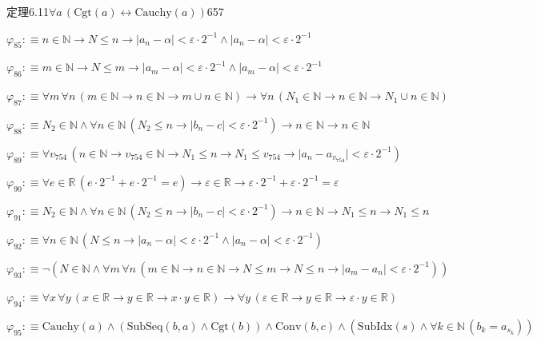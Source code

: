 \begin{fullproof}{定理6.11}{$\forall a\,(\mathrm{Cgt}(a) \leftrightarrow \mathrm{Cauchy}(a))$}{657}
\begin{abbrevlist}
\item $\varphi_{85} :\equiv n \in \mathbb{N} \to N \leq n \to \lvert a_{n} - \alpha \rvert < \varepsilon \cdot 2^{-1} \land \lvert a_{n} - \alpha \rvert < \varepsilon \cdot 2^{-1}$
\item $\varphi_{86} :\equiv m \in \mathbb{N} \to N \leq m \to \lvert a_{m} - \alpha \rvert < \varepsilon \cdot 2^{-1} \land \lvert a_{m} - \alpha \rvert < \varepsilon \cdot 2^{-1}$
\item $\varphi_{87} :\equiv \forall m\,\forall n\,(m \in \mathbb{N} \to n \in \mathbb{N} \to m \cup n \in \mathbb{N}) \to \forall n\,(N_{1} \in \mathbb{N} \to n \in \mathbb{N} \to N_{1} \cup n \in \mathbb{N})$
\item $\varphi_{88} :\equiv N_{2} \in \mathbb{N} \land \forall n \in \mathbb{N}\,(N_{2} \leq n \to \lvert b_{n} - c \rvert < \varepsilon \cdot 2^{-1}) \to n \in \mathbb{N} \to n \in \mathbb{N}$
\item $\varphi_{89} :\equiv \forall v_{754}\,(n \in \mathbb{N} \to v_{754} \in \mathbb{N} \to N_{1} \leq n \to N_{1} \leq v_{754} \to \lvert a_{n} - a_{v_{754}} \rvert < \varepsilon \cdot 2^{-1})$
\item $\varphi_{90} :\equiv \forall e \in \mathbb{R}\,(e \cdot 2^{-1} + e \cdot 2^{-1} = e) \to \varepsilon \in \mathbb{R} \to \varepsilon \cdot 2^{-1} + \varepsilon \cdot 2^{-1} = \varepsilon$
\item $\varphi_{91} :\equiv N_{2} \in \mathbb{N} \land \forall n \in \mathbb{N}\,(N_{2} \leq n \to \lvert b_{n} - c \rvert < \varepsilon \cdot 2^{-1}) \to n \in \mathbb{N} \to N_{1} \leq n \to N_{1} \leq n$
\item $\varphi_{92} :\equiv \forall n \in \mathbb{N}\,(N \leq n \to \lvert a_{n} - \alpha \rvert < \varepsilon \cdot 2^{-1} \land \lvert a_{n} - \alpha \rvert < \varepsilon \cdot 2^{-1})$
\item $\varphi_{93} :\equiv \neg (N \in \mathbb{N} \land \forall m\,\forall n\,(m \in \mathbb{N} \to n \in \mathbb{N} \to N \leq m \to N \leq n \to \lvert a_{m} - a_{n} \rvert < \varepsilon \cdot 2^{-1}))$
\item $\varphi_{94} :\equiv \forall x\,\forall y\,(x \in \mathbb{R} \to y \in \mathbb{R} \to x \cdot y \in \mathbb{R}) \to \forall y\,(\varepsilon \in \mathbb{R} \to y \in \mathbb{R} \to \varepsilon \cdot y \in \mathbb{R})$
\item $\varphi_{95} :\equiv \mathrm{Cauchy}(a) \land (\mathrm{SubSeq}(b,a) \land \mathrm{Cgt}(b)) \land \mathrm{Conv}(b,c) \land (\mathrm{SubIdx}(s) \land \forall k \in \mathbb{N}\,(b_{k} = a_{s_{k}}))$

\end{abbrevlist}
\end{fullproof}
